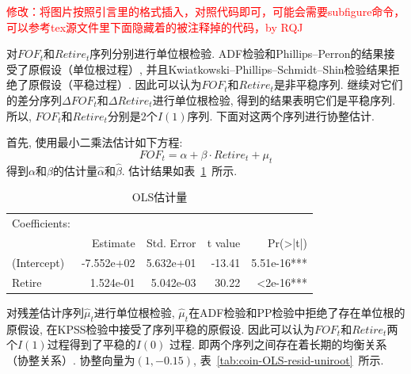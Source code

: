 \documentclass[10.5pt,onecolumn,a4paper]{article}%
\begin{document}
\textcolor{red}{修改：将图片按照引言里的格式插入，对照代码即可，可能会需要subfigure命令，可以参考tex源文件里下面隐藏着的被注释掉的代码，by RQJ}


对${FOF_t}$和${Retire_t}$序列分别进行单位根检验. ADF检验和Phillips–Perron的结果接受了原假设（单位根过程）, 并且Kwiatkowski–Phillips–Schmidt–Shin检验结果拒绝了原假设（平稳过程）. 因此可以认为${FOF_t}$和${Retire_t}$是非平稳序列.
继续对它们的差分序列${\Delta FOF_t}$和${\Delta Retire_t}$进行单位根检验, 得到的结果表明它们是平稳序列. 所以, ${FOF_t}$和${Retire_t}$分别是2个$I(1)$序列. 下面对这两个序列进行协整估计.

首先, 使用最小二乘法估计如下方程:
$$FOF_t = \alpha + \beta \cdot Retire_t + \mu_t$$
得到$\alpha$和$\beta$的估计量$\hat{\alpha}$和$\hat{\beta}$. 估计结果如表~\ref{tab:coin-OLS-estimate}~所示.

\begin{table}[ht]
    \centering
    \caption{OLS估计量}
    \label{tab:coin-OLS-estimate}
    \begin{tabular}{l | rrrr}
        Coefficients: &            &            &         &                     \\
                      & Estimate   & Std. Error & t value & Pr(\textgreater|t|) \\  \hline
        (Intercept)   & -7.552e+02 & 5.632e+01  & -13.41  & 5.51e-16***        \\
        Retire        & 1.524e-01  & 5.042e-03  & 30.22   & \textless 2e-16***
    \end{tabular}
\end{table}


对残差估计序列$\hat{\mu}_t$进行单位根检验, $\hat{\mu}_t$在ADF检验和PP检验中拒绝了存在单位根的原假设, 在KPSS检验中接受了序列平稳的原假设.
因此可以认为${FOF_t}$和${Retire_t}$两个$I(1)$过程得到了平稳的$I(0)$
过程. 即两个序列之间存在着长期的均衡关系（协整关系）. 协整向量为$(1, -0.15)$, 表~\ref{tab:coin-OLS-resid-uniroot}~所示.
\end{document}
